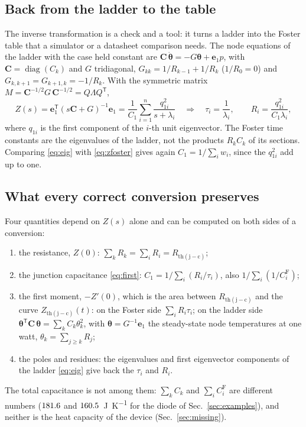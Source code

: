 \documentclass[10pt,a4paper]{scrartcl}
\newcommand{\Zjc}{Z_\mathrm{th(j-c)}}
\newcommand{\Rjc}{R_\mathrm{th(j-c)}}
\newcommand{\JK}{\si{\joule\per\kelvin}}
\begin{document}
\subsection{Back from the ladder to the table}
\label{sec:inverse}
The inverse transformation is a check and a tool: it turns a ladder into the Foster table that a simulator or a datasheet comparison needs. The node equations of the ladder with the case held constant are $\mathbf{C}\,\dot{\boldsymbol\theta} = -G\boldsymbol\theta + \mathbf{e}_1 p$, with $\mathbf{C} = \operatorname{diag}(C_k)$ and $G$ tridiagonal, $G_{kk} = 1/R_{k-1} + 1/R_k$ ($1/R_0 = 0$) and $G_{k,k+1} = G_{k+1,k} = -1/R_k$. With the symmetric matrix $M = \mathbf{C}^{-1/2}G\,\mathbf{C}^{-1/2} = Q\Lambda Q^\mathsf{T}$,
\begin{equation}
Z(s) = \mathbf{e}_1^\mathsf{T}(s\mathbf{C} + G)^{-1}\mathbf{e}_1 = \frac{1}{C_1}\sum_{i=1}^{n} \frac{q_{1i}^2}{s + \lambda_i}
\quad\Longrightarrow\quad
\tau_i = \frac{1}{\lambda_i} , \qquad R_i = \frac{q_{1i}^2}{C_1\lambda_i} ,
\label{eq:eig}
\end{equation}
where $q_{1i}$ is the first component of the $i$-th unit eigenvector. The Foster time constants are the eigenvalues of the ladder, not the products $R_kC_k$ of its sections. Comparing \eqref{eq:eig} with \eqref{eq:zfoster} gives again $C_1 = 1/\sum_i w_i$, since the $q_{1i}^2$ add up to one.

\subsection{What every correct conversion preserves}
\label{sec:checks}
Four quantities depend on $Z(s)$ alone and can be computed on both sides of a conversion:
\begin{enumerate}
\item the resistance, $Z(0)$: $\sum_k R_k = \sum_i R_i = \Rjc$;
\item the junction capacitance \eqref{eq:first}: $C_1 = 1/\sum_i (R_i/\tau_i)$, also $1/\sum_i (1/C_i^\mathrm{F})$;
\item the first moment, $-Z'(0)$, which is the area between $\Rjc$ and the curve $\Zjc(t)$: on the Foster side $\sum_i R_i\tau_i$; on the ladder side $\boldsymbol\theta^\mathsf{T}\mathbf{C}\,\boldsymbol\theta = \sum_k C_k\theta_k^2$, with $\boldsymbol\theta = G^{-1}\mathbf{e}_1$ the steady-state node temperatures at one watt, $\theta_k = \sum_{j\ge k} R_j$;
\item the poles and residues: the eigenvalues and first eigenvector components of the ladder \eqref{eq:eig} give back the $\tau_i$ and $R_i$.
\end{enumerate}
The total capacitance is not among them: $\sum_k C_k$ and $\sum_i C^\mathrm{F}_i$ are different numbers ($181.6$ and $160.5$~\JK{} for the diode of Sec.~\ref{sec:examples}), and neither is the heat capacity of the device (Sec.~\ref{sec:missing}).
\end{document}
